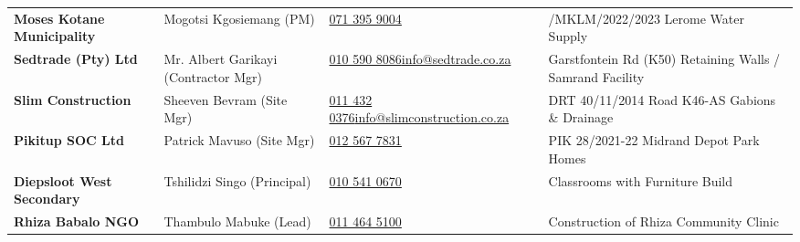 \begin{tabularx}{\textwidth}{@{}
    >{\raggedright\arraybackslash}p{3.5cm} 
    >{\raggedright\arraybackslash}p{3.1cm} 
    >{\raggedright\arraybackslash}p{4.2cm} 
    >{\raggedright\arraybackslash}X
@{}}
\rowcolor{mhbluelight}
\fontsize{7.6pt}{9.4pt}\selectfont\bfseries Moses Kotane Municipality & \fontsize{7.6pt}{9.4pt}\selectfont Mogotsi Kgosiemang (PM) & \fontsize{7.6pt}{9.4pt}\selectfont \href{tel:0713959004}{071 395 9004} & \fontsize{7.6pt}{9.4pt}\selectfont 014/MKLM/2022/2023 Lerome Water Supply \\
\fontsize{7.6pt}{9.4pt}\selectfont\bfseries Sedtrade (Pty) Ltd & \fontsize{7.6pt}{9.4pt}\selectfont Mr. Albert Garikayi (Contractor Mgr) & \fontsize{7.6pt}{9.4pt}\selectfont \href{tel:0105908086}{010 590 8086}\newline\href{mailto:info@sedtrade.co.za}{info@sedtrade.co.za} & \fontsize{7.6pt}{9.4pt}\selectfont Garstfontein Rd (K50) Retaining Walls / Samrand Facility \\
\rowcolor{mhbluelight}
\fontsize{7.6pt}{9.4pt}\selectfont\bfseries Slim Construction & \fontsize{7.6pt}{9.4pt}\selectfont Sheeven Bevram (Site Mgr) & \fontsize{7.6pt}{9.4pt}\selectfont \href{tel:0114320376}{011 432 0376}\newline\href{mailto:info@slimconstruction.co.za}{info@slimconstruction.co.za} & \fontsize{7.6pt}{9.4pt}\selectfont DRT 40/11/2014 Road K46-AS Gabions \& Drainage \\
\fontsize{7.6pt}{9.4pt}\selectfont\bfseries Pikitup SOC Ltd & \fontsize{7.6pt}{9.4pt}\selectfont Patrick Mavuso (Site Mgr) & \fontsize{7.6pt}{9.4pt}\selectfont \href{tel:0125677831}{012 567 7831} & \fontsize{7.6pt}{9.4pt}\selectfont PIK 28/2021-22 Midrand Depot Park Homes \\
\rowcolor{mhbluelight}
\fontsize{7.6pt}{9.4pt}\selectfont\bfseries Diepsloot West Secondary & \fontsize{7.6pt}{9.4pt}\selectfont Tshilidzi Singo (Principal) & \fontsize{7.6pt}{9.4pt}\selectfont \href{tel:0105410670}{010 541 0670} & \fontsize{7.6pt}{9.4pt}\selectfont 4 Classrooms with Furniture Build \\
\fontsize{7.6pt}{9.4pt}\selectfont\bfseries Rhiza Babalo NGO & \fontsize{7.6pt}{9.4pt}\selectfont Thambulo Mabuke (Lead) & \fontsize{7.6pt}{9.4pt}\selectfont \href{tel:0114645100}{011 464 5100} & \fontsize{7.6pt}{9.4pt}\selectfont Construction of Rhiza Community Clinic \\
\end{tabularx}
\renewcommand{\arraystretch}{1}

\clearpage
